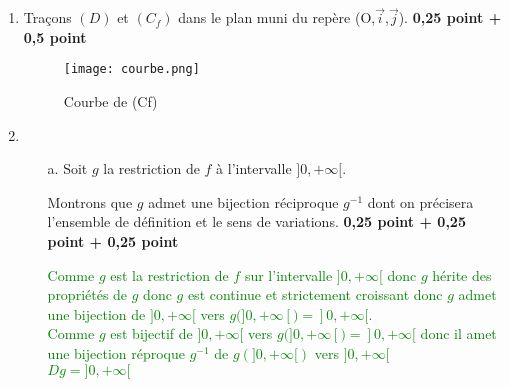 \documentclass[12pt]{article}
\begin{document}
\begin{enumerate}
\begin{enumerate}
\end{enumerate}
\item Traçons $(D)$ et $(C_{f})$ dans le plan muni du repère (O,$\vec{i}$,$\vec{j}$). \textbf{ 0,25 point + 0,5 point}
\begin{figure}[h]
\centering
\texttt{[image: courbe.png]}
\caption{Courbe de (Cf)}
\label{fig:monimage}
\end{figure}
\item
\begin{enumerate}
\item[a.] Soit $g$ la restriction de $f$ à l'intervalle $]0, +\infty[.$

	 Montrons que $g$ admet une bijection réciproque $g^{-1}$ dont on précisera l'ensemble de définition et le
	 sens de variations. \textbf{ 0,25 point + 0,25 point + 0,25 point}

\textcolor{green}{Comme $g$ est la restriction de $f$ sur l'intervalle $]0, +\infty[$ donc $g$ hérite des propriétés de $g$ donc $g$ est continue et strictement croissant donc $g$ admet une bijection de $]0, +\infty[$ vers $g(]0, +\infty[)=]0, +\infty[$.\\
Comme $g$ est bijectif de $]0, +\infty[$ vers $g(]0, +\infty[)=]0, +\infty[$ donc il amet une bijection réproque $g^{-1}$ de $g(]0, +\infty[)$ vers  $]0, +\infty[$\\
$Dg=]0, +\infty[$}
\end{enumerate}
\end{enumerate}
\end{document}
